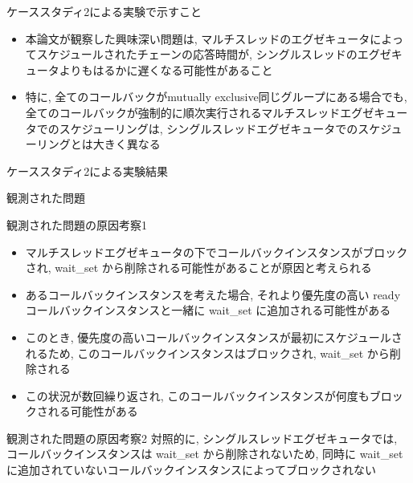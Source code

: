 \begin{frame}{ケーススタディ2による実験で示すこと}
    \begin{itemize}
        \item 本論文が観察した興味深い問題は, マルチスレッドのエグゼキュータによってスケジュールされたチェーンの応答時間が, シングルスレッドのエグゼキュータよりもはるかに遅くなる可能性があること
        \item 特に, 全てのコールバックがmutually exclusive同じグループにある場合でも, 全てのコールバックが強制的に順次実行されるマルチスレッドエグゼキュータでのスケジューリングは, シングルスレッドエグゼキュータでのスケジューリングとは大きく異なる
    \end{itemize}
\end{frame}

\begin{frame}{ケーススタディ2による実験結果}
\end{frame}

\begin{frame}{観測された問題}
\end{frame}

\begin{frame}{観測された問題の原因考察1}
 \begin{itemize}
    \item マルチスレッドエグゼキュータの下でコールバックインスタンスがブロックされ, wait\_set から削除される可能性があることが原因と考えられる
    \item あるコールバックインスタンスを考えた場合, それより優先度の高い ready コールバックインスタンスと一緒に wait\_set に追加される可能性がある
    \item このとき, 優先度の高いコールバックインスタンスが最初にスケジュールされるため, このコールバックインスタンスはブロックされ, wait\_set から削除される
    \item この状況が数回繰り返され, このコールバックインスタンスが何度もブロックされる可能性がある
 \end{itemize}
\end{frame}

\begin{frame}{観測された問題の原因考察2}
    対照的に, シングルスレッドエグゼキュータでは, コールバックインスタンスは wait\_set から削除されないため, 同時に wait\_set に追加されていないコールバックインスタンスによってブロックされない
\end{frame}

